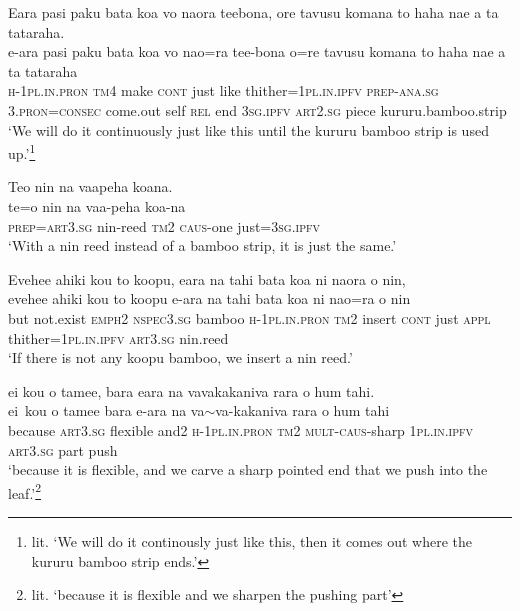 \ea\label{ex:text12-30}
Eara pasi paku bata koa vo naora teebona, ore tavusu komana to haha nae a ta tataraha.\\
\gll e-ara	pasi	paku	bata	koa	vo	nao=ra	tee-bona	o=re	tavusu	komana	to	haha	nae	a	ta	tataraha\\
     \textsc{h}-1\textsc{pl}.\textsc{in}.\textsc{pron}	\textsc{tm}4	make	\textsc{cont}	just	like	thither=1\textsc{pl}.\textsc{in}.\textsc{ipfv}	\textsc{prep}-\textsc{ana}.\textsc{sg}	3.\textsc{pron}=\textsc{consec}	come.out	self	\textsc{rel}	end	3\textsc{sg}.\textsc{ipfv}	\textsc{art}2.\textsc{sg}	piece	kururu.bamboo.strip\\
\glt `We will do it continuously just like this until the kururu bamboo strip is used up.'\footnote{lit. `We will do it continously just like this, then it comes out where the kururu bamboo strip ends.'}
\z

\ea\label{ex:text12-31}
Teo nin na vaapeha koana.\\
\gll te=o	nin	na	vaa-peha	koa-na\\
     \textsc{prep}=\textsc{art}3.\textsc{sg}	nin-reed	\textsc{tm}2	\textsc{caus}-one	just=3\textsc{sg}.\textsc{ipfv}\\
\glt `With a nin reed instead of a bamboo strip, it is just the same.'
\z

\ea\label{ex:text12-32}
Evehee ahiki kou to koopu, eara na tahi bata koa ni naora o nin,\\
\gll evehee	ahiki	kou	to	koopu	e-ara	na	tahi	bata	koa	ni	nao=ra	o	nin\\
     but	not.exist	\textsc{emph}2	\textsc{nspec}3.\textsc{sg}	bamboo	\textsc{h}-1\textsc{pl}.\textsc{in}.\textsc{pron}	\textsc{tm}2	insert	\textsc{cont}	just	\textsc{appl}	thither=1\textsc{pl}.\textsc{in}.\textsc{ipfv}	\textsc{art}3.\textsc{sg}	nin.reed\\
\glt `If there is not any koopu bamboo, we insert a nin reed.'
\z

\ea\label{ex:text12-33}
ei kou o tamee, bara eara na vavakakaniva rara o hum tahi.\\
\gll ei~kou	o	tamee	bara	e-ara	na	va{$\sim$}va-kakaniva	rara	o	hum	tahi\\
     because	\textsc{art}3.\textsc{sg}	flexible	and2	\textsc{h}-1\textsc{pl}.\textsc{in}.\textsc{pron}	\textsc{tm}2	\textsc{mult}-\textsc{caus}-sharp	1\textsc{pl}.\textsc{in}.\textsc{ipfv}	\textsc{art}3.\textsc{sg}	part	push\\
\glt `because it is flexible, and we carve a sharp pointed end that we push into the leaf.'\footnote{lit. `because it is flexible and we sharpen the pushing part'}
\z

